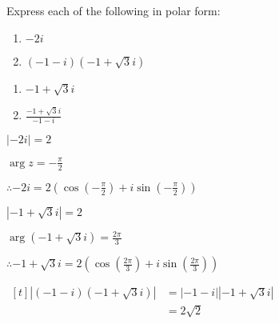\documentclass[11pt,a4paper]{book}
\begin{document}
\newpage

\begin{example}

Express each of the following in polar form:

\begin{minipage}[t]{0.5\textwidth}

\begin{enumerate}[label=(\alph*)]

\item  $-2i$

\addtocounter{enumi}{1}

\item  $\left(-1-i\right)\left(-1+\sqrt{3}i\right)$

\end{enumerate}

\end{minipage}
\begin{minipage}[t]{0.5\textwidth}

\begin{enumerate}[label=(\alph*),start=2]

\item  $-1+\sqrt{3}i$

\addtocounter{enumi}{1}

\item  ${\displaystyle \frac{-1+\sqrt{3}i}{-1-i}}$

\addtocounter{enumi}{1}

\end{enumerate}

\end{minipage}

\Solution


\begin{tasks}[label=(\alph*),after-item-skip=.8cm]

\task  $\left|-2i\right|=2$

${\displaystyle \arg z=-\frac{\pi}{2}}$

${\displaystyle \therefore-2i=2\left(\cos\left(-\frac{\pi}{2}\right)+i\sin\left(-\frac{\pi}{2}\right)\right)}$


\task  $\left|-1+\sqrt{3}i\right|=2$

${\displaystyle \arg\left(-1+\sqrt{3}i\right)=\frac{2\pi}{3}}$

${\displaystyle \therefore-1+\sqrt{3}i=2\left(\cos\left(\frac{2\pi}{3}\right)+i\sin\left(\frac{2\pi}{3}\right)\right)}$


\task
$
\begin{aligned}[t]
\left|\left(-1-i\right)\left(-1+\sqrt{3}i\right)\right| & =\left|-1-i\right|\left|-1+\sqrt{3}i\right|\\
 & =2\sqrt{2}
\end{aligned}
$


\end{tasks}
\end{example}
\end{document}
